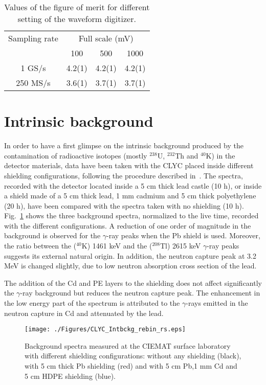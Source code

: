 \documentclass[review,number,sort&compress]{elsarticle}
\begin{document}
\begin{table}[!htb]
\centering
\begin{tabular}{@{} c @{\kern.7em} c @{\kern1em} c @{\kern0.7em} c @{}} \hline 
Sampling rate & \multicolumn{3}{c}{Full scale (mV) } \\
              & 100 & 500  & 1000  \\ \hline
1 GS/s & 4.2(1) & 4.2(1) & 4.2(1) \\
250 MS/s & 3.6(1) & 3.7(1) & 3.7(1) \\ \hline
\end{tabular}
\caption{Values of the figure of merit for different setting of the waveform digitizer.}
\label{tabfom} 
\end{table}


\section{Intrinsic background}

In order to have a first glimpse on the intrinsic background produced by the contamination of radioactive isotopes (mostly $^{238}$U, $^{232}$Th and $^{40}$K) in the detector materials, data have been taken with the CLYC placed inside different shielding configurations, following the procedure described in~\cite{Gia}. The spectra, recorded with the detector located inside a 5 cm thick lead castle (10 h), or inside a shield made of a 5 cm thick lead, 1 mm cadmium and 5 cm thick polyethylene (20 h), have been compared with the spectra taken with no shielding (10 h). Fig.~\ref{bckg} shows the three background spectra, normalized to the live time, recorded with the different configurations. A reduction of one order of magnitude in the background is observed for the $\gamma$-ray peaks when the Pb shield is used. Moreover, the ratio between the ($^{40}$K) 1461 keV and the ($^{208}$Tl) 2615 keV $\gamma$-ray peaks suggests its external natural origin. In addition, the neutron capture peak at 3.2 MeV is changed slightly, due to low neutron absorption cross section of the lead.   

The addition of the Cd and PE layers to the shielding does not affect significantly the $\gamma$-ray background but reduces the neutron capture peak. The enhancement in the low energy part of the spectrum is attributed to the $\gamma$-rays emitted in the neutron capture in Cd and attenuated by the lead. 

\begin{figure}[h!]

\centering

\texttt{[image: ./Figures/CLYC\_Intbckg\_rebin\_rs.eps]}

\caption{Background spectra measured at the CIEMAT surface laboratory with different shielding configurations: without any shielding (black), with 5 cm thick Pb shielding (red) and with 5 cm Pb,1 mm Cd and 5 cm HDPE shielding (blue). }

\label{bckg}

\end{figure}
\end{document}
